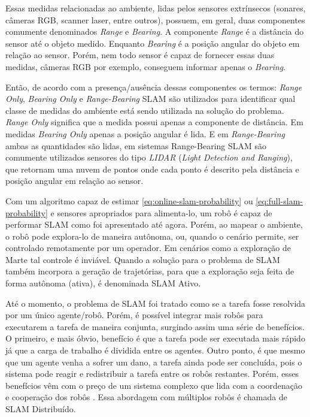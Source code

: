 Essas medidas relacionadas ao ambiente, lidas pelos sensores extrínsecos 
(sonares, câmeras RGB, scanner laser, entre outros), possuem, em geral, duas 
componentes comumente denominados \textit{Range} e \textit{Bearing}. 
A componente \textit{Range} é a distância do sensor até o objeto medido. 
Enquanto \textit{Bearing} é a posição angular do objeto em relação ao sensor. 
Porém, nem todo sensor é capaz de fornecer essas duas medidas, câmeras RGB por 
exemplo, conseguem  informar apenas o \textit{Bearing}.

Então, de acordo com a presença/ausência dessas componentes os termos: 
\textit{Range Only}, \textit{Bearing Only} e \textit{Range-Bearing} SLAM são 
utilizados para identificar qual classe de medidas do ambiente está sendo
utilizada na solução do problema. \textit{Range Only} significa que a medida 
possui apenas a 
componente de distância. Em medidas \textit{Bearing Only} apenas a posição 
angular é lida. E em \textit{Range-Bearing} ambas as quantidades são lidas, em 
sistemas Range-Bearing SLAM são comumente utilizados sensores do tipo 
\emph{LIDAR} (\textit{Light Detection and Ranging}), que retornam uma nuvem de 
pontos onde cada ponto é descrito pela distância e posição angular em relação ao 
sensor.

Com um algoritmo capaz de estimar \ref{eq:online-slam-probability} ou 
\ref{eq:full-slam-probability} e sensores apropriados para alimenta-lo, 
um robô é capaz de performar SLAM como foi apresentado até agora. Porém, ao mapear 
o ambiente, o robô pode explora-lo de maneira autônoma, ou, quando 
o cenário permite, ser controlado remotamente por um operador. Em cenários 
como a exploração de Marte tal controle é inviável. Quando a 
solução para o problema de SLAM também incorpora a geração de trajetórias, para 
que a exploração seja feita de forma autônoma (ativa), é denominada SLAM Ativo.

Até o momento, o problema de SLAM foi tratado como se a tarefa fosse resolvida 
por um único agente/robô. Porém, é possível integrar mais robôs para executarem 
a tarefa de maneira conjunta, surgindo assim uma série de benefícios. O primeiro, 
e mais óbvio, benefício é que a tarefa pode ser executada mais rápido já que a 
carga de trabalho é dividida entre os agentes. Outro ponto, é que mesmo que um 
agente venha a sofrer um dano, a tarefa ainda pode ser concluída, pois o sistema 
pode reagir e redistribuir a tarefa entre os robôs restantes. Porém, esses 
benefícios vêm com o preço de um sistema complexo que lida com a 
coordenação e cooperação dos robôs \cite{saeedi2016multiple}. Essa abordagem com 
múltiplos robôs é chamada de SLAM Distribuído.

